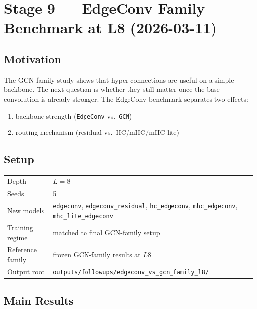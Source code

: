 \documentclass[11pt,a4paper]{article}
\begin{document}
\section{Stage 9 --- EdgeConv Family Benchmark at L8 (2026-03-11)}
\label{sec:edgeconv}

\subsection{Motivation}

The GCN-family study shows that hyper-connections are useful on a simple backbone.
The next question is whether they still matter once the base convolution is already stronger.
The EdgeConv benchmark separates two effects:
\begin{enumerate}[noitemsep]
  \item backbone strength (\texttt{EdgeConv} vs.\ \texttt{GCN})
  \item routing mechanism (residual vs.\ HC/mHC/mHC-lite)
\end{enumerate}

\subsection{Setup}

\begin{table}[h]
\centering
\begin{tabular}{L{4.2cm} L{7.2cm}}
\toprule
Depth & $L=8$ \\
Seeds & 5 \\
New models & \texttt{edgeconv}, \texttt{edgeconv\_residual}, \texttt{hc\_edgeconv}, \texttt{mhc\_edgeconv}, \texttt{mhc\_lite\_edgeconv} \\
Training regime & matched to final GCN-family setup \\
Reference family & frozen GCN-family results at $L8$ \\
Output root & \texttt{outputs/followups/edgeconv\_vs\_gcn\_family\_l8/} \\
\bottomrule
\end{tabular}
\end{table}

\subsection{Main Results}
\end{document}
